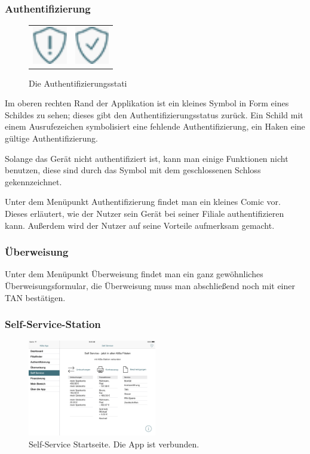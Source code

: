 \subsubsection{Authentifizierung}
\begin{figure}[h]
    \centering
	\begin{tabular}{@{}cc@{}}
        	\includegraphics[width=1.5cm]{Pictures/notauth} &
    		\includegraphics[width=1.5cm]{Pictures/authed}
    \end{tabular}
	\caption{Die Authentifizierungsstati\label{fig4}}
\end{figure}
\pagebreak
\noindent	Im oberen rechten Rand der Applikation ist ein kleines Symbol in Form eines Schildes zu sehen; dieses gibt den Authentifizierungsstatus zurück. Ein Schild mit einem Ausrufezeichen symbolisiert eine fehlende Authentifizierung, ein Haken eine gültige Authentifizierung.

	Solange das Gerät nicht authentifiziert ist, kann man einige Funktionen nicht benutzen, diese sind durch das Symbol mit dem geschlossenen Schloss gekennzeichnet.

	Unter dem Menüpunkt Authentifizierung findet man ein kleines Comic vor. Dieses erläutert, wie der Nutzer sein Gerät bei seiner Filiale authentifizieren kann. Außerdem wird der Nutzer auf seine Vorteile aufmerksam gemacht.

\subsubsection{Überweisung}
	Unter dem Menüpunkt Überweisung findet man ein ganz gewöhnliches Überweisungsformular, die Überweisung muss man abschließend noch mit einer TAN bestätigen.

\subsubsection{Self-Service-Station}
\begin{figure}[h]
	\centering
  \includegraphics[width=0.5\textwidth]{Pictures/SSverbunden}
	\caption{Self-Service Startseite. Die App ist verbunden.}
	\label{fig5}
\end{figure}

